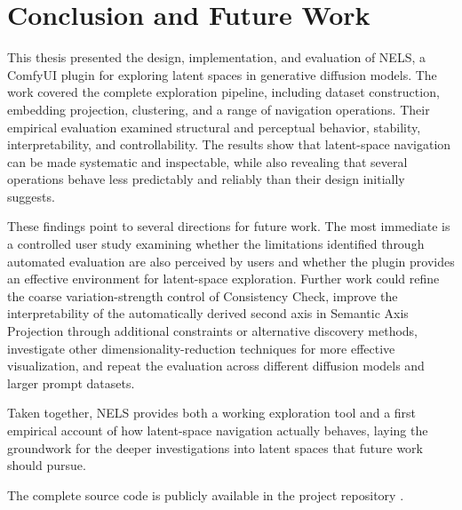 \chapter{Conclusion and Future Work}\label{ch:conclusion}

This thesis presented the design, implementation, and evaluation of NELS, a ComfyUI plugin for exploring latent spaces in generative diffusion models. The work covered the complete exploration pipeline, including dataset construction, embedding projection, clustering, and a range of navigation operations. Their empirical evaluation examined structural and perceptual behavior, stability, interpretability, and controllability. The results show that latent-space navigation can be made systematic and inspectable, while also revealing that several operations behave less predictably and reliably than their design initially suggests.

These findings point to several directions for future work. The most immediate is a controlled user study examining whether the limitations identified through automated evaluation are also perceived by users and whether the plugin provides an effective environment for latent-space exploration. Further work could refine the coarse variation-strength control of Consistency Check, improve the interpretability of the automatically derived second axis in Semantic Axis Projection through additional constraints or alternative discovery methods, investigate other dimensionality-reduction techniques for more effective visualization, and repeat the evaluation across different diffusion models and larger prompt datasets.

Taken together, NELS provides both a working exploration tool and a first empirical account of how latent-space navigation actually behaves, laying the groundwork for the deeper investigations into latent spaces that future work should pursue.

The complete source code is publicly available in the project repository \cite{davidgh2026nels}.
